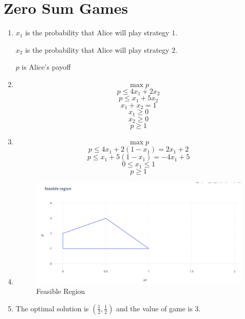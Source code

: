 \documentclass[11pt]{article}
\newenvironment{qparts}{\begin{enumerate}[{(}a{)}]}{\end{enumerate}}
\begin{document}
\section{Zero Sum Games}
\begin{qparts}
	\item 
	
	$x_1$ is the probability that Alice will play strategy $1$. 
	
	$x_2$ is the probability that Alice will play strategy $2$.
	
	$p$ is Alice's payoff
	
	\item
	
	\[
		\max p
	\]
	\[
		p \le 4x_1 +2x_2
	\]
	\[
		p \le x_1 +5x_2
	\]
	\[
		x_1 + x_2 = 1
	\]
	\[
		x_1 \ge 0
	\]
	\[
		x_2 \ge 0
	\]
	\[
		p \ge 1
	\]
	
	\item
	
	\[
		\max p
	\]
	\[
		p \le 4x_1 +2(1 - x_1) = 2x_1 + 2
	\]
	\[
		p \le x_1 +5(1 - x_1) = -4x_1 + 5
	\]
	\[
		0 \le x_1 \le 1
	\]
	\[
		p \ge 1
	\]
	
	\item \text{ }
	
	\begin{figure}[h]
	\centering
	\includegraphics[width=.8\textwidth]{feasible_region.png}
	\caption{\label{fig:feasible_region}Feasible Region}
	\end{figure}
	
	\item
	
	The optimal solution is $(\frac{1}{2}, \frac{1}{2})$ and the value of game is 3.
	
\end{qparts}




\newpage
\end{document}
